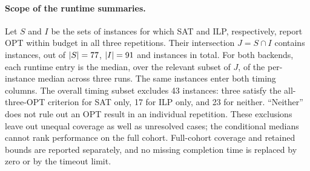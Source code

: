 \paragraph{Scope of the runtime summaries.}
Let $S$ and $I$ be the sets of instances for which SAT and ILP,
respectively, report OPT within budget in all three repetitions.
Their intersection $J=S\cap I$ contains \ProgressJointStable{} instances,
out of $|S|=77{}$, $|I|=91{}$ and
\ProgressInstances{} instances in total. For both backends, each runtime
entry is the median, over the relevant subset of $J$, of the per-instance
median across three runs. The same instances enter both timing columns.
The overall timing subset excludes 43 instances: three satisfy the
all-three-OPT criterion for SAT only, 17 for ILP only, and 23 for neither.
``Neither'' does not rule out an OPT result in an individual repetition.
These exclusions leave out unequal coverage as well as unresolved cases;
the conditional medians cannot rank performance on the full cohort.
Full-cohort coverage and retained bounds are reported separately, and no
missing completion time is replaced by zero or by the timeout limit.
